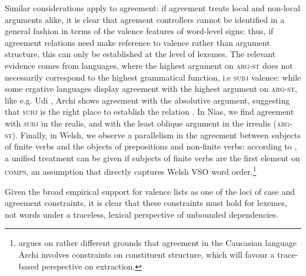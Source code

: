 \documentclass[output=paper
                ,modfonts
                ,nonflat
	        ,collection
	        ,collectionchapter
	        ,collectiontoclongg
 	        ,biblatex
                ,babelshorthands
                ,newtxmath
                ,draftmode
                ,colorlinks, citecolor=brown
]{./langsci/langscibook}
\begin{document}
{Similar considerations apply to agreement: if agreement treats local
and non-local arguments alike, it is clear that agrement controllers
cannot be identified in a general fashion in terms of the valence
features of word-level signs: thus, if agreement relations need make
reference to valence rather than argument structure, this can only be
established at the level of lexemes. The relevant evidence comes from
languages, where the highest argument on \textsc{arg-st} does not
necessarily correspond to the highest grammatical function, i.e
\textsc{subj} valence: while some ergative languages display agreement
with the highest argument on \textsc{arg-st}, like e.g. Udi
\citep{harris_a84udi}, Archi \citep{kibrik94:_archi} shows agreement
with the absolutive argument, suggesting that \textsc{subj} is the
right place to establish the relation
\citep{Crysmann:09}. %
In Nias, we find agreement with \textsc{subj} in the realis, and with
the least oblique argument in the irrealis (\textsc{arg-st}). Finally,
in Welsh, we observe a parallelism in the agreement between subjects
of finite verbs and the objects of prepositions and non-finite verbs:
according to \citet{Borsley89}, a unified treatment can be given if
subjects of finite verbs are the first element on \textsc{comps}, an
assumption that directly captures Welsh VSO word order.\footnote{
  \citet{Borsley:16:Archi} argues on rather different grounds that
  agreement in the Caucasian language Archi involves constraints on
  constituent structure, which will favour a trace-based perspective on
  extraction. }

Given the broad empirical support for valence lists as one of the loci
of case and agreement constraints, it is clear that these constraints
must hold for lexemes, not words under a traceless, lexical
perspective of unbounded dependencies.









}
\end{document}
